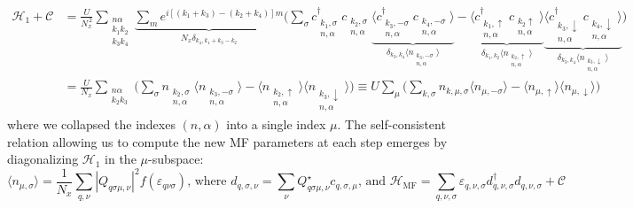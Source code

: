 \begin{equation}
\begin{split}
\mathcal{H}_1 + \mathcal{C} &= \frac{U}{N_x^{\,2}} \sum_{\substack{n \alpha \\ k_1 k_2 \\ k_3 k_4}} \underbrace{\sum_m e^{i [ (k_1 + k_3) - (k_2 + k_4) ] m}}_{N_x \delta_{k_4, k_1 + k_3 - k_2}} \bigg( \sum_\sigma c_{\substack{k_1, \sigma \\ n, \alpha}}^\dagger c_{\substack{k_2, \sigma \\ n, \alpha}} \underbrace{\big\langle c_{\substack{k_3, -\sigma\\ n, \alpha}}^\dagger c_{\substack{k_4, -\sigma \\ n, \alpha}} \big\rangle}_{\delta_{k_3, k_4} \big\langle n_{\substack{k_3,-\sigma \\ n, \alpha}} \big\rangle} - \underbrace{\big\langle c_{\substack{k_1, \uparrow \\ n, \alpha}}^\dagger c_{\substack{k_2  \uparrow \\n, \alpha}} \big\rangle}_{\delta_{k_1, k_2} \big\langle n_{\substack{k_2,\uparrow \\ n, \alpha}} \big\rangle} \underbrace{\big\langle c_{\substack{k_3, \downarrow \\ n, \alpha}}^\dagger c_{\substack{k_4, \downarrow \\ n, \alpha}} \big\rangle}_{\delta_{k_3, k_4} \big\langle n_{\substack{k_3,\downarrow \\ n, \alpha}} \big\rangle}  \bigg) \\
&= \frac{U}{N_x} \sum_{\substack{n \alpha \\ k_2 k_3}} \bigg( \sum_\sigma n_{\substack{k_2, \sigma \\ n, \alpha}} \big\langle n_{\substack{k_3, -\sigma \\ n, \alpha}} \big\rangle - \big\langle n_{\substack{k_2, \uparrow \\ n, \alpha}} \big\rangle \big\langle n_{\substack{k_3, \downarrow \\ n, \alpha}} \big\rangle \bigg) \equiv
U \sum_{\mu} \bigg( \sum_{k, \sigma} n_{k,\mu, \sigma} \big\langle n_{\mu, -\sigma} \big\rangle - \big\langle n_{\mu, \uparrow} \big\rangle \big\langle n_{\mu, \downarrow} \big\rangle \bigg)
\end{split}
\end{equation}
where we collapsed the indexes $(n, \alpha)$ into a single index $\mu$.
The self-consistent relation allowing us to compute the new MF parameters at each step emerges by diagonalizing $\mathcal{H}_1$ in the $\mu$-subspace:
\begin{equation}
\big\langle n_{\mu, \sigma} \big\rangle = \frac{1}{N_x}\sum_{q, \nu} | Q_{q \sigma \mu, \nu} |^2 f ( \varepsilon_{q \nu \sigma} ) , \, \text{where} \,\, d_{q, \sigma, \nu} = \sum_\nu Q_{q \sigma \mu, \nu}^\star c_{q ,\sigma, \mu} ,  \, \text{and} \,\, \mathcal{H}_{\text{MF}} = \sum_{q, \nu, \sigma} \varepsilon_{q, \nu, \sigma} d_{q, \nu, \sigma}^\dagger d_{q, \nu, \sigma} + \mathcal{C}
\end{equation}

